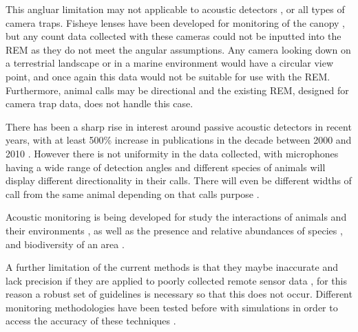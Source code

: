 This angluar limitation may not applicable to acoustic detectors \citep{adams2012you}, or all types of camera traps. Fisheye lenses have been developed for monitoring of the canopy \citep{brusa2014increasing}, but any count data collected with these cameras could not be inputted into the REM as they do not meet the angular assumptions. Any camera looking down on a terrestrial landscape or in a marine environment would have a circular view point, and once again this data would not be suitable for use with the REM.  Furthermore, animal calls may be directional and the existing REM, designed for camera trap data, does not handle this case.

There has been a sharp rise in interest around passive acoustic detectors in recent years, with at least 500\% increase in publications in the decade between 2000 and 2010 \citep{kessel2014review}. However there is not uniformity in the data collected, with microphones having a wide range of detection angles and different species of animals will display different directionality in their calls. There will even be different widths of call from the same animal depending on that calls purpose \citep{jakobsen2012convergent}.

Acoustic monitoring is being developed for study the interactions of animals and their environments \citep{blumstein2011acoustic, straight2014passive, marcoux2011local, rogers2013density}, as well as the presence and relative abundances of species \citep{mckown2012wireless, marcoux2011local}, and biodiversity of an area \citep{ depraetere2012monitoring}.

A further limitation of the current methods is that they maybe inaccurate and lack precision if they are applied to poorly collected remote sensor data \citep{rees2011testing}, for this reason a robust set of guidelines is necessary so that this does not occur. Different monitoring methodologies have been tested before with simulations in order to access the accuracy of these techniques \citep{ivan2013using, rees2011testing, borchers2008spatially}. 

